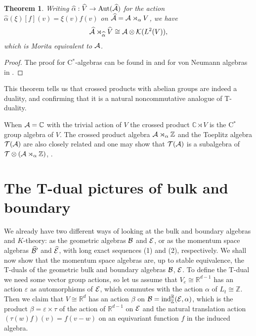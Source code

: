 \documentclass[11pt]{article}
\newcommand{\real}{{\mathbb R}}
\newcommand{\complex}{{\mathbb C}}
\newcommand{\integer}{{\mathbb Z}}
\newcommand{\dual}[1]{{\widehat{#1}}}
\newcommand{\alg}{{\cal A}}
\newcommand{\cb}{{\cal B}}
\newcommand{\ce}{{\cal E}}
\newcommand{\cT}{{\cal T}}
\newcommand{\cpt}{{\cal K}}
\newcommand{\ind}{{\rm ind}}
\newcommand{\aut}{{\rm Aut}}
\newcommand{\wh}[1]{\widehat{#1}}
\newtheorem{theorem}{Theorem}
\begin{document}
\begin{theorem}  
Writing $\wh{\alpha}: \wh{V} \to \aut(\wh{\alg})$ for the action $\wh{\alpha}(\xi)[f](v) = \xi(v)f(v)$ on $\wh{\alg} = \alg\rtimes_\alpha V$, we have
$$
\dual{\alg}\rtimes_{\wh{\alpha}}\dual{V} \cong \alg\otimes \cpt(L^2(V)),
$$
which is Morita equivalent to $\alg$.
\end{theorem}

\begin{proof}
The proof for  C$^*$-algebras can be found in \cite{T74} and for von Neumann algebras in \cite{T67}.
\end{proof}

This theorem tells us that crossed products with abelian groups are  indeed a duality, and confirming that it is a  natural noncommutative analogue of T-duality.


When $\alg = \complex$ with the trivial action of $V$ the crossed product $\complex\rtimes V$  is the C$^*$ group algebra of $V$. The crossed product algebra $\alg\rtimes_\alpha \integer$ and the Toeplitz algebra $\cT(\alg)$ are also closely related and one may show that $\cT(\alg)$ is a subalgebra of $\cT\otimes (\alg\rtimes_\alpha \integer)$, \cite[Prop. 5.8]{CMR}.



%
%


\section{The T-dual pictures of bulk and boundary}

We already have two different ways of looking at the bulk and boundary algebras and $K$-theory:
as the geometric algebras $\cb$ and $\ce$, or as the momentum space algebras $\wh{\cb}^\prime$ and $\wh{\ce}$, with long exact sequences (1) and (2), respectively. 
We shall now show that the momentum space algebras are, up to stable equivalence,  the T-duals of the geometric bulk and boundary algebras $\cb$, $\ce$.
To define the T-dual we need some vector group actions, so let us assume that $V_e \cong\real^{d-1}$ has an action $\varepsilon$ as automorphisms of $\ce$, which commutes with the action $\alpha$ of   $L_t \cong \integer$.
Then we claim that $V \cong \real^d$ has an action $\beta$ on $\cb = \ind_\integer^\real(\ce, \alpha)$, which is the product $\beta = \varepsilon\times\tau$ of the action of $\real^{d-1}$ on $\ce$ and the natural translation action $(\tau(w)f)(v) = f(v-w)$ on an equivariant function $f$ in the induced algebra.
\end{document}
